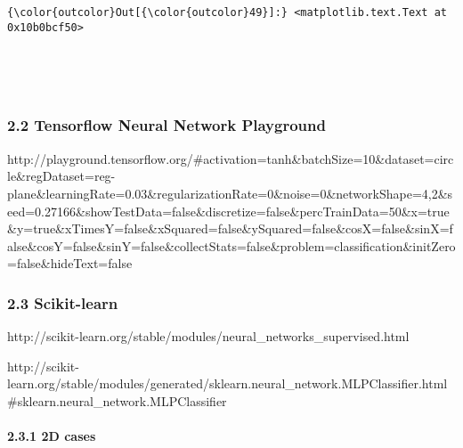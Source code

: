 \documentclass[11pt]{article}
\begin{document}
\begin{Verbatim}[commandchars=\\\{\}]
{\color{outcolor}Out[{\color{outcolor}49}]:} <matplotlib.text.Text at 0x10b0bcf50>
\end{Verbatim}
            
    \begin{center}
    \end{center}
    { \hspace*{\fill} \\}
    
    \begin{center}
    \end{center}
    { \hspace*{\fill} \\}
    
    \subsubsection{2.2 Tensorflow Neural Network
Playground}\label{tensorflow-neural-network-playground}

http://playground.tensorflow.org/\#activation=tanh\&batchSize=10\&dataset=circle\&regDataset=reg-plane\&learningRate=0.03\&regularizationRate=0\&noise=0\&networkShape=4,2\&seed=0.27166\&showTestData=false\&discretize=false\&percTrainData=50\&x=true\&y=true\&xTimesY=false\&xSquared=false\&ySquared=false\&cosX=false\&sinX=false\&cosY=false\&sinY=false\&collectStats=false\&problem=classification\&initZero=false\&hideText=false

\subsubsection{2.3 Scikit-learn}\label{scikit-learn}

http://scikit-learn.org/stable/modules/neural\_networks\_supervised.html

http://scikit-learn.org/stable/modules/generated/sklearn.neural\_network.MLPClassifier.html\#sklearn.neural\_network.MLPClassifier

\paragraph{2.3.1 2D cases}\label{d-cases}
\end{document}
